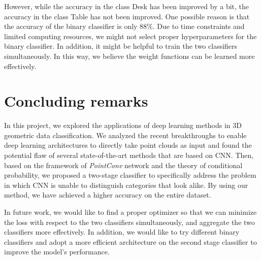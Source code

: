 \documentclass{article}
\begin{document}
However, while the accuracy in the class Desk has been improved by a bit, the accuracy in the class Table has not been improved. One possible reason is that the accuracy of the binary classifier is only 88\%. Due to time constraints and limited computing resources, we might not select proper hyperparameters for the binary classifier. In addition, it might be helpful to train the two classifiers simultaneously. In this way, we believe the weight functions can be learned more effectively.


\section{Concluding remarks}
In this project, we explored the applications of deep learning methods in 3D geometric data classification. We analyzed the recent breakthroughs to enable deep learning architectures to directly take point clouds as input and found the potential flaw of several state-of-the-art methods that are based on CNN. Then, based on the framework of \textit{PointConv} network and the theory of conditional probability, we proposed a two-stage classifier to specifically address the problem in which CNN is unable to distinguish categories that look alike. By using our method, we have achieved a higher accuracy on the entire dataset.

In future work, we would like to find a proper optimizer so that we can minimize the loss with respect to the two classifiers simultaneously, and aggregate the two classifiers more effectively. In addition, we would like to try different binary classifiers and adopt a more efficient architecture on the second stage classifier to improve the model's performance.



\end{document}
